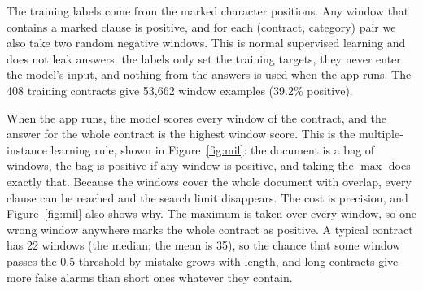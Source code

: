 The training labels come from the marked character positions. Any window that contains a marked clause is positive, and for each (contract, category) pair we also take two random negative windows. This is normal supervised learning and does not leak answers: the labels only set the training targets, they never enter the model's input, and nothing from the answers is used when the app runs. The 408 training contracts give 53{,}662 window examples (39.2\% positive).

When the app runs, the model scores every window of the contract, and the answer for the whole contract is the highest window score. This is the multiple-instance learning rule, shown in Figure~\ref{fig:mil}: the document is a bag of windows, the bag is positive if any window is positive, and taking the $\max$ does exactly that. Because the windows cover the whole document with overlap, every clause can be reached and the search limit disappears. The cost is precision, and Figure~\ref{fig:mil} also shows why. The maximum is taken over every window, so one wrong window anywhere marks the whole contract as positive. A typical contract has 22 windows (the median; the mean is 35), so the chance that some window passes the 0.5 threshold by mistake grows with length, and long contracts give more false alarms than short ones whatever they contain.

